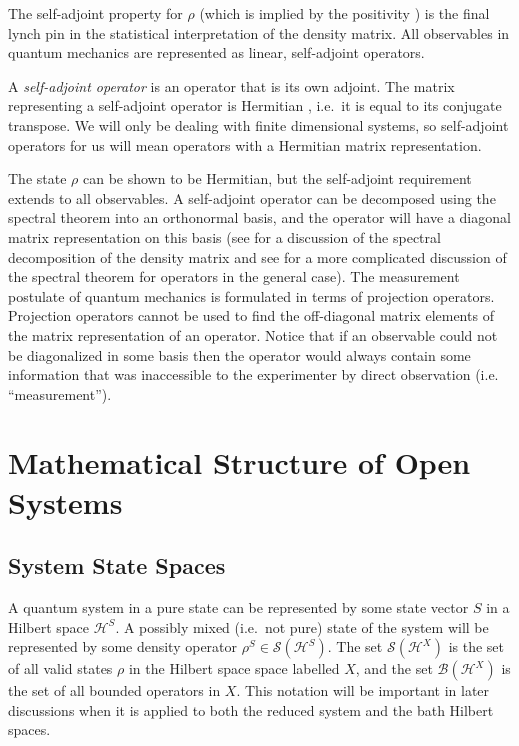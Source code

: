 The self-adjoint property for $\rho$ (which is implied by the positivity \cite{Eidelman2004}) is the final lynch pin in the statistical interpretation of the density matrix.  All observables in quantum mechanics are represented as linear, self-adjoint operators.  
\begin{definition}
A {\em self-adjoint operator} is an operator that is its own adjoint.  The matrix representing a self-adjoint operator is Hermitian \cite{Byron1992}, i.e.\ it is equal to its conjugate transpose.  We will only be dealing with finite dimensional systems, so self-adjoint operators for us will mean operators with a Hermitian matrix representation.
\end{definition}

The state $\rho$ can be shown to be Hermitian, but the self-adjoint requirement extends to all observables.  A self-adjoint operator can be decomposed using the spectral theorem into an orthonormal basis, and the operator will have a diagonal matrix representation on this basis (see \cite{Nielsen2010} for a discussion of the spectral decomposition of the density matrix and see \cite{Breuer2007} for a more complicated discussion of the spectral theorem for operators in the general case).  The measurement postulate of quantum mechanics is formulated in terms of projection operators.  Projection operators cannot be used to find the off-diagonal matrix elements of the matrix representation of an operator.  Notice that if an observable could not be diagonalized in some basis then the operator would always contain some information that was inaccessible to the experimenter by direct observation (i.e. ``measurement'').

\section{Mathematical Structure of Open Systems}

\subsection{System State Spaces}
A quantum system in a pure state can be represented by some state vector $S$ in a Hilbert space $\mathcal{H}^S$.  A possibly mixed (i.e.\ not pure) state of the system will be represented by some density operator $\rho^S\in \mathcal{S}(\mathcal{H}^S)$.  The set $\mathcal{S}(\mathcal{H}^X)$ is the set of all valid states $\rho$ in the Hilbert space space labelled $X$, and the set $\mathcal{B}(\mathcal{H}^X)$ is the set of all bounded operators in $X$.  This notation will be important in later discussions when it is applied to both the reduced system and the bath Hilbert spaces.

